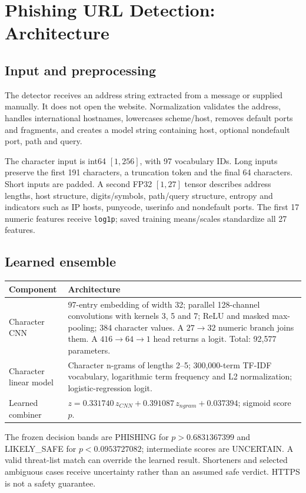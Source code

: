 \documentclass[11pt,a4paper]{article}
\newcommand{\chapterpage}[1]{\clearpage\section{#1}}
\begin{document}
\chapterpage{Phishing URL Detection: Architecture}
\subsection*{Input and preprocessing}
The detector receives an address string extracted from a message or supplied manually.
It does not open the website. Normalization validates the address, handles international
hostnames, lowercases scheme/host, removes default ports and fragments, and creates a
model string containing host, optional nondefault port, path and query.

The character input is int64 $[1,256]$, with 97 vocabulary IDs. Long inputs preserve
the first 191 characters, a truncation token and the final 64 characters. Short inputs
are padded. A second FP32 $[1,27]$ tensor describes address lengths, host structure,
digits/symbols, path/query structure, entropy and indicators such as IP hosts, punycode,
userinfo and nondefault ports. The first 17 numeric features receive \texttt{log1p};
saved training means/scales standardize all 27 features.

\subsection*{Learned ensemble}
\begin{tabularx}{\textwidth}{@{}L{31mm}Y@{}}
\toprule Component & Architecture\\\midrule
Character CNN & 97-entry embedding of width 32; parallel 128-channel convolutions with kernels 3, 5 and 7; ReLU and masked max-pooling; 384 character values. A $27\rightarrow32$ numeric branch joins them. A $416\rightarrow64\rightarrow1$ head returns a logit. Total: 92,577 parameters.\\
Character linear model & Character n-grams of lengths 2--5; 300,000-term TF-IDF vocabulary, logarithmic term frequency and L2 normalization; logistic-regression logit.\\
Learned combiner & $z=0.331740\,z_{CNN}+0.391087\,z_{ngram}+0.037394$; sigmoid score $p$.\\
\bottomrule
\end{tabularx}

The frozen decision bands are PHISHING for $p>0.6831367399$ and LIKELY\_SAFE for
$p<0.0953727082$; intermediate scores are UNCERTAIN. A valid threat-list match can
override the learned result. Shorteners and selected ambiguous cases receive uncertainty
rather than an assumed safe verdict. HTTPS is not a safety guarantee.
\end{document}
